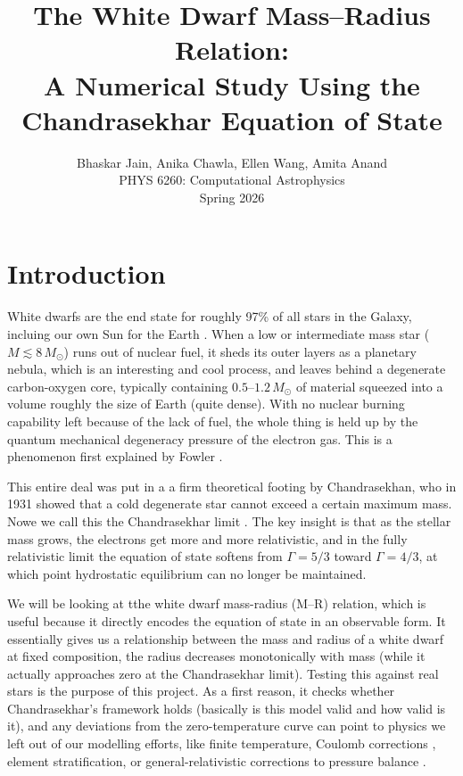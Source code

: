 \documentclass[12pt,letterpaper]{article}
\title{\textbf{The White Dwarf Mass--Radius Relation:\\
A Numerical Study Using the Chandrasekhar Equation of State}}
\author{Bhaskar Jain, Anika Chawla, Ellen Wang, Amita Anand\\[4pt]
        \small PHYS 6260: Computational Astrophysics\\[2pt]
        \small Spring 2026}
\date{}
\begin{document}
\maketitle
\thispagestyle{empty}

\section{Introduction}
\label{sec:intro}

White dwarfs are the end state for roughly 97\% of all stars in the Galaxy,
incluing our own Sun for the Earth \citep{fontaine2001}.
When a low or intermediate mass star ($M \lesssim 8\,M_\odot$) runs out of nuclear fuel,
it sheds its outer layers as a planetary nebula, which is an interesting and cool process, and leaves behind a degenerate
carbon-oxygen core, typically containing $0.5$--$1.2\,M_\odot$ of material squeezed
into a volume roughly the size of Earth (quite dense).
With no nuclear burning capability left because of the lack of fuel, the whole thing is held up by the quantum mechanical
degeneracy pressure of the electron gas. This is a phenomenon first explained by Fowler
\citep{fowler1926}.

This entire deal was put in a a firm theoretical footing by Chandrasekhan,
who in 1931 showed that a cold degenerate star cannot exceed a certain maximum mass.
Nowe we call this the Chandrasekhar limit \citep{chandrasekhar1931}\citep{chandrasekhar1939}.
The key insight is that as the stellar mass grows, the electrons get more and more
relativistic, and in the fully relativistic limit the equation of state softens from
$\Gamma = 5/3$ toward $\Gamma = 4/3$, at which point hydrostatic equilibrium can no
longer be maintained.

We will be looking at tthe white dwarf mass-radius (M--R) relation, which is useful because it directly encodes the
equation of state in an observable form. It essentially gives us a relationship between the mass and radius of a white dwarf at fixed composition, the radius decreases
monotonically with mass (while it actually approaches zero at the Chandrasekhar limit).
Testing this against real stars is the purpose of this project. As a first reason, it checks whether
Chandrasekhar's framework holds (basically is this model valid and how valid is it), and any deviations from the zero-temperature curve
can point to physics we left out of our modelling efforts, like finite temperature, Coulomb corrections
\citep{salpeter1961,hamada1961}, element stratification, or general-relativistic
corrections to pressure balance \citep{shapiro1983}.
\end{document}
